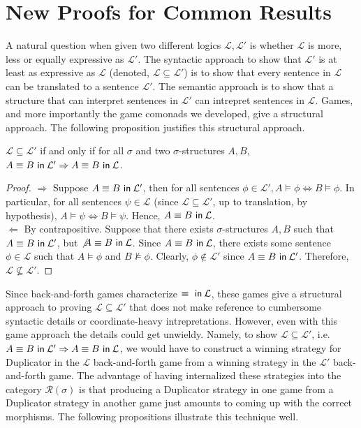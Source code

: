 \section{New Proofs for Common Results}\label{sec:commonResults}
A natural question when given two different logics $\mathcal{L},\mathcal{L'}$ is whether $\mathcal{L}$ is more, less or equally expressive as $\mathcal{L'}$. The syntactic approach to show that $\mathcal{L'}$ is at least as expressive as $\mathcal{L}$ (denoted, $\mathcal{L} \subseteq \mathcal{L'}$) is to show that every sentence in $\mathcal{L}$ can be translated to a sentence $\mathcal{L'}$. The semantic approach is to show that a structure that can interpret sentences in $\mathcal{L'}$ can intrepret sentences in $\mathcal{L}$. Games, and more importantly the game comonads we developed, give a structural approach. The following proposition justifies this structural approach. 
\begin{prop}
$\mathcal{L} \subseteq \mathcal{L'}$ if and only if for all $\sigma$ and two $\sigma$-structures $A,B$, ${A \equiv B \ \mathsf{in}\: \mathcal{L'}} \Rightarrow {A \equiv B \ \mathsf{in}\: \mathcal{L}}$.
\begin{proof}
$\Rightarrow$ Suppose ${A \equiv B \ \mathsf{in}\: \mathcal{L'}}$, then for all sentences $\phi \in \mathcal{L'}, A \vDash \phi \Leftrightarrow B \vDash \phi$. In particular, for all sentences $\psi \in \mathcal{L}$ (since $\mathcal{L} \subseteq \mathcal{L'}$, up to translation, by hypothesis), $A \vDash \psi \Leftrightarrow B \vDash \psi$. Hence, ${A \equiv B \ \mathsf{in}\: \mathcal{L}}$.\\
$\Leftarrow$ By contrapositive. Suppose that there exists $\sigma$-structures $A,B$ such that ${A \equiv B \ \mathsf{in}\: \mathcal{L'}}$, but $\not {A \equiv B \ \mathsf{in}\: \mathcal{L}}$. Since ${A \equiv B \ \mathsf{in}\: \mathcal{L}}$, there exists some sentence $\phi \in \mathcal{L}$ such that $A \vDash \phi$ and $B \not\vDash \phi$. Clearly, $\phi \not\in \mathcal{L'}$ since ${A \equiv B \ \mathsf{in}\: \mathcal{L'}}$. Therefore, $\mathcal{L} \not\subseteq \mathcal{L'}$.
\end{proof}
\label{prop:inclusionToEquiv}
\end{prop}
Since back-and-forth games characterize ${ \equiv  \ \mathsf{in}\: \mathcal{L}}$, these games give a structural approach to proving $\mathcal{L} \subseteq \mathcal{L'}$ that does not make reference to cumbersome syntactic details or coordinate-heavy intrepretations. However, even with this game approach the details could get unwieldy. Namely, to show $\mathcal{L} \subseteq \mathcal{L'}$, i.e. ${A \equiv B \ \mathsf{in}\: \mathcal{L'}} \Rightarrow {A \equiv B \ \mathsf{in}\: \mathcal{L}}$, we would have to construct a winning strategy for Duplicator in the $\mathcal{L}$ back-and-forth game from a winning strategy in the $\mathcal{L'}$ back-and-forth game. The advantage of having internalized these strategies into the category $\mathcal{R}(\sigma)$ is that producing a Duplicator strategy in one game from a Duplicator strategy in another game just amounts to coming up with the correct morphisms. The following propositions illustrate this technique well. \\~\\

